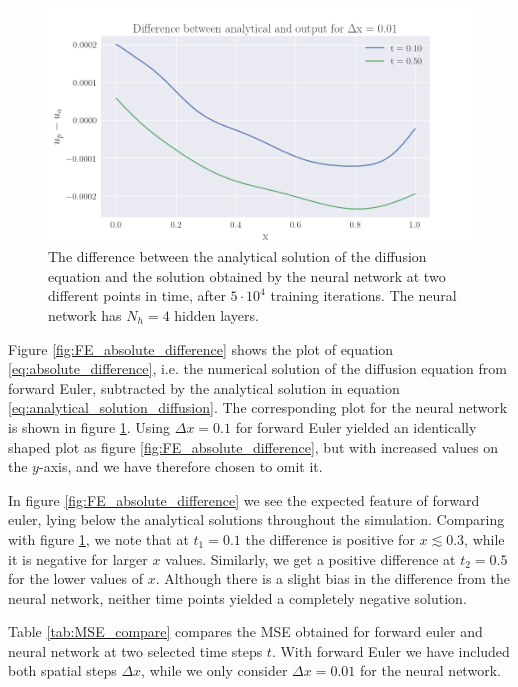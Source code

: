 \documentclass[12pt]{extarticle}
\begin{document}
\begin{figure}[h]
	\centering
	\includegraphics[width=0.8\linewidth]{../output/plots/final_compare_NN.png}
	\caption{The difference between the analytical solution of the diffusion equation and the solution obtained by the neural network at two different points in time, after $5\cdot10^4$ training iterations. The neural network has $N_h=4$ hidden layers.} \label{fig:NN_relative_error}
\end{figure}

Figure \ref{fig:FE_absolute_difference} shows the plot of equation \eqref{eq:absolute_difference}, i.e. the numerical solution of the diffusion equation from forward Euler, subtracted by the analytical solution in equation \eqref{eq:analytical_solution_diffusion}. The corresponding plot for the neural network is shown in figure \ref{fig:NN_relative_error}. Using $\Delta x=0.1$ for forward Euler yielded an identically shaped plot as figure \ref{fig:FE_absolute_difference}, but with increased values on the $y$-axis, and we have therefore chosen to omit it. 

In figure \ref{fig:FE_absolute_difference} we see the expected feature of forward euler, lying below the analytical solutions throughout the simulation. Comparing with figure \ref{fig:NN_relative_error}, we note that at $t_1=0.1$ the difference is positive for $x\lesssim0.3$, while it is negative for larger $x$ values. Similarly, we get a positive difference at $t_2=0.5$ for the lower values of $x$. Although there is a slight bias in the difference from the neural network, neither time points yielded a completely negative solution.   

Table \ref{tab:MSE_compare} compares the MSE obtained for forward euler and neural network at two selected time steps $t$. With forward Euler we have included both spatial steps $\Delta x$, while we only consider $\Delta x=0.01$ for the neural network. 
\end{document}
